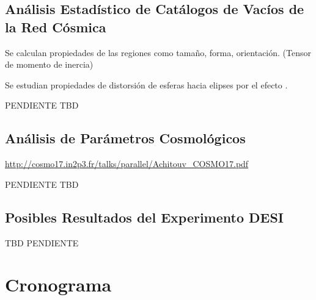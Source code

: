 \documentclass[preprint]{aastex62}
\begin{document}
  \subsection{Análisis Estadístico de Catálogos de Vacíos de la Red Cósmica}

  Se calculan propiedades de las regiones como tamaño, forma, orientación. (Tensor de momento de inercia) \citep{El-Ad1997}

  Se estudian propiedades de distorsión de esferas hacia elipses por el efecto \citet{AlcockPaczynski1979}.

  \medskip
  PENDIENTE
  \medskip  TBD
  
  \subsection{Análisis de Parámetros Cosmológicos}

  \url{http://cosmo17.in2p3.fr/talks/parallel/Achitouv_COSMO17.pdf}

    \medskip
  PENDIENTE
  \medskip
  TBD
  
  \subsection{Posibles Resultados del Experimento DESI}

  TBD
    \medskip
  PENDIENTE
  \medskip

  \section{Cronograma}
\end{document}
